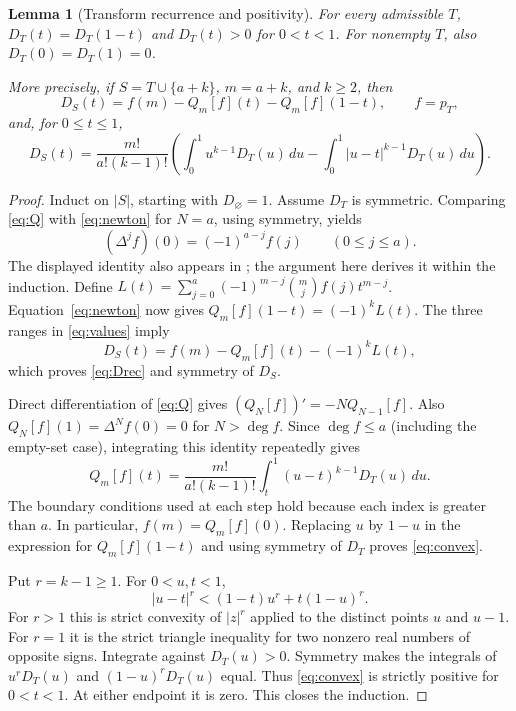 \documentclass[11pt]{article}
\newtheorem{lemma}[theorem]{Lemma}
\theoremstyle{definition}
\begin{document}
\begin{lemma}[Transform recurrence and positivity]\label{lem:D}
For every admissible $T$, $D_T(t)=D_T(1-t)$ and $D_T(t)>0$ for $0<t<1$. For nonempty $T$, also $D_T(0)=D_T(1)=0$.

More precisely, if $S=T\cup\{a+k\}$, $m=a+k$, and $k\ge2$, then
\begin{equation}\label{eq:Drec}
 D_S(t)=f(m)-Q_m[f](t)-Q_m[f](1-t),\qquad f=p_T,
\end{equation}
and, for $0\le t\le1$,
\begin{equation}\label{eq:convex}
 D_S(t)=\frac{m!}{a!(k-1)!}
 \left(\int_0^1u^{k-1}D_T(u)\,du
       -\int_0^1|u-t|^{k-1}D_T(u)\,du\right).
\end{equation}
\end{lemma}
\begin{proof}
Induct on $|S|$, starting with $D_\varnothing=1$. Assume $D_T$ is symmetric. Comparing \eqref{eq:Q} with \eqref{eq:newton} for $N=a$, using symmetry, yields
\[
 (\Delta^j f)(0)=(-1)^{a-j}f(j)\qquad(0\le j\le a).
\]
The displayed identity also appears in \cite[Theorem~4.3]{BFT}; the argument here derives it within the induction.
Define $L(t)=\sum_{j=0}^a(-1)^{m-j}\binom mj f(j)t^{m-j}$. Equation~\eqref{eq:newton} now gives $Q_m[f](1-t)=(-1)^kL(t)$. The three ranges in \eqref{eq:values} imply
\[
 D_S(t)=f(m)-Q_m[f](t)-(-1)^kL(t),
\]
which proves \eqref{eq:Drec} and symmetry of $D_S$.

Direct differentiation of \eqref{eq:Q} gives $(Q_N[f])'=-NQ_{N-1}[f]$. Also $Q_N[f](1)=\Delta^Nf(0)=0$ for $N>\deg f$. Since $\deg f\le a$ (including the empty-set case), integrating this identity repeatedly gives
\begin{equation}\label{eq:extend}
 Q_m[f](t)=\frac{m!}{a!(k-1)!}\int_t^1(u-t)^{k-1}D_T(u)\,du.
\end{equation}
The boundary conditions used at each step hold because each index is greater than $a$. In particular, $f(m)=Q_m[f](0)$. Replacing $u$ by $1-u$ in the expression for $Q_m[f](1-t)$ and using symmetry of $D_T$ proves \eqref{eq:convex}.

Put $r=k-1\ge1$. For $0<u,t<1$,
\[
 |u-t|^r<(1-t)u^r+t(1-u)^r.
\]
For $r>1$ this is strict convexity of $|z|^r$ applied to the distinct points $u$ and $u-1$. For $r=1$ it is the strict triangle inequality for two nonzero real numbers of opposite signs. Integrate against $D_T(u)>0$. Symmetry makes the integrals of $u^rD_T(u)$ and $(1-u)^rD_T(u)$ equal. Thus \eqref{eq:convex} is strictly positive for $0<t<1$. At either endpoint it is zero. This closes the induction.
\end{proof}
\end{document}
